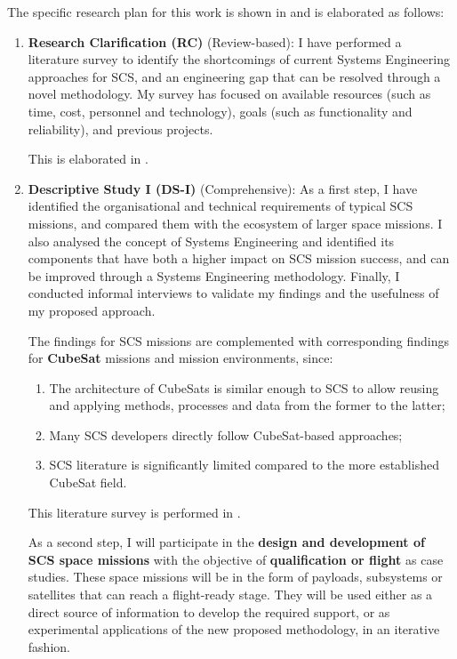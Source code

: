 \documentclass[a4paper,nobib,justified,final]{tufte-book}
\begin{document}
The specific research plan for this work is shown in  and is elaborated as follows:
\begin{enumerate}
	\item \textbf{Research Clarification (RC)} (Review-based):
	I have performed a literature survey to identify the shortcomings of 
	current Systems Engineering approaches for \ac{SCS}, and an engineering gap that can be resolved through a novel methodology. My survey has focused on available resources (such as time, cost, personnel and technology), goals (such as functionality and reliability), and previous projects.
	
	This is elaborated in .
	\item \textbf{Descriptive Study I (DS-I)} (Comprehensive):
	As a first step, I have identified the organisational and technical requirements of typical \acs{SCS} missions, and compared them with the ecosystem of larger space missions. I also analysed the concept of Systems Engineering and identified its components that have both a higher impact on \acs{SCS} mission success, and can be improved through a Systems Engineering methodology. Finally, I conducted informal interviews to validate my findings and the usefulness of my proposed approach.

	The findings for \acs{SCS} missions are complemented with corresponding findings for \textbf{CubeSat} missions and mission environments, since:
	\begin{enumerate}[itemsep=-2ex]
		\item The architecture of CubeSats is similar enough to \acs{SCS} to allow reusing and applying methods, processes and data from the former to the latter;
		\item Many \acs{SCS} developers directly follow CubeSat-based approaches;
		\item \acs{SCS} literature is significantly limited compared to the more established CubeSat field.
	\end{enumerate}

	This literature survey is performed in .
	
	As a second step, I will participate in the \textbf{design and development of \acs{SCS} space missions} with the objective of \textbf{qualification or flight} as case studies. These space missions will be in the form of payloads, subsystems or satellites that can reach a flight-ready stage. They will be used either as a direct source of information to develop the required support, or as experimental applications of the new proposed methodology, in an iterative fashion.
	

\end{enumerate}
\end{document}
